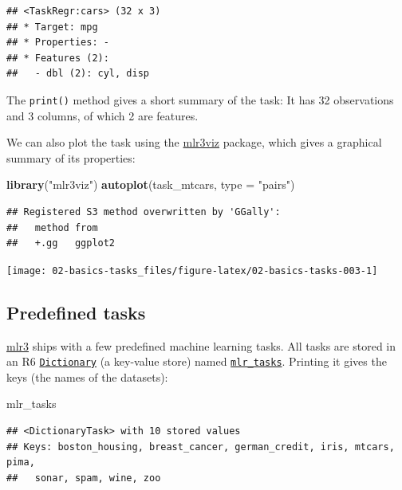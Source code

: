 \documentclass[]{scrbook}
\newenvironment{Shaded}{\begin{snugshade}}{\end{snugshade}}
\newcommand{\DataTypeTok}[1]{\textcolor[rgb]{0.13,0.29,0.53}{#1}}
\newcommand{\KeywordTok}[1]{\textcolor[rgb]{0.13,0.29,0.53}{\textbf{#1}}}
\newcommand{\NormalTok}[1]{#1}
\newcommand{\StringTok}[1]{\textcolor[rgb]{0.31,0.60,0.02}{#1}}
\renewenvironment{Shaded} {\begin{snugshade}\small} {\end{snugshade}}
\begin{document}
\begin{verbatim}
## <TaskRegr:cars> (32 x 3)
## * Target: mpg
## * Properties: -
## * Features (2):
##   - dbl (2): cyl, disp
\end{verbatim}

The \texttt{print()} method gives a short summary of the task:
It has 32 observations and 3 columns, of which 2 are features.

We can also plot the task using the \href{https://mlr3viz.mlr-org.com}{mlr3viz} package, which gives a graphical summary of its properties:

\begin{Shaded}
\begin{Highlighting}[]
\KeywordTok{library}\NormalTok{(}\StringTok{"mlr3viz"}\NormalTok{)}
\KeywordTok{autoplot}\NormalTok{(task_mtcars, }\DataTypeTok{type =} \StringTok{"pairs"}\NormalTok{)}
\end{Highlighting}
\end{Shaded}

\begin{verbatim}
## Registered S3 method overwritten by 'GGally':
##   method from   
##   +.gg   ggplot2
\end{verbatim}

\begin{center}\texttt{[image: 02-basics-tasks\_files/figure-latex/02-basics-tasks-003-1]} \end{center}

\hypertarget{tasks-predefined}{%
\subsection{Predefined tasks}\label{tasks-predefined}}

\href{https://mlr3.mlr-org.com}{mlr3} ships with a few predefined machine learning tasks.
All tasks are stored in an R6 \href{https://mlr3misc.mlr-org.com/reference/Dictionary.html}{\texttt{Dictionary}} (a key-value store) named \href{https://mlr3.mlr-org.com/reference/mlr_tasks.html}{\texttt{mlr\_tasks}}.
Printing it gives the keys (the names of the datasets):

\begin{Shaded}
\begin{Highlighting}[]
\NormalTok{mlr_tasks}
\end{Highlighting}
\end{Shaded}

\begin{verbatim}
## <DictionaryTask> with 10 stored values
## Keys: boston_housing, breast_cancer, german_credit, iris, mtcars, pima,
##   sonar, spam, wine, zoo
\end{verbatim}
\end{document}
